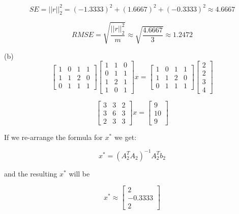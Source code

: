 \documentclass[unicode,11pt,a4paper,oneside,numbers=endperiod,openany]{scrartcl}
\newcommand{\norm}[1]{\lvert\lvert #1 \rvert\rvert}
\begin{document}
\begin{equation*}
 SE = \norm{r}_2^2 = (-1.3333)^2 + (1.6667)^2 + (-0.3333)^2 \approx 4.6667
\end{equation*}

\begin{equation*}
 RMSE = \sqrt{\frac{\norm{r}_2^2}{m}} \approx \sqrt{\frac{4.6667}{3}} \approx 1.2472 
\end{equation*}

(b)
\begin{equation*}
\begin{bmatrix}
1 & 0 & 1 & 1 \\
1 & 1 & 2 & 0 \\
0 & 1 & 1 & 1
\end{bmatrix}
\begin{bmatrix}
1 & 1 & 0 \\
0 & 1 & 1 \\
1 & 2 & 1 \\
1 & 0 & 1
\end{bmatrix}
x = \begin{bmatrix}
1 & 0 & 1 & 1 \\
1 & 1 & 2 & 0 \\
0 & 1 & 1 & 1
\end{bmatrix}
\begin{bmatrix}
2 \\
2 \\
3 \\
4
\end{bmatrix}
\end{equation*}

\begin{equation*}
 \begin{bmatrix}
  3 & 3 & 2 \\
  3 & 6 & 3 \\
  2 & 3 & 3
 \end{bmatrix}x = 
 \begin{bmatrix}
  9 \\
  10 \\
  9
 \end{bmatrix}
\end{equation*}

If we re-arrange the formula for ${x^*}$ we get:

\begin{equation}
 x^* = (A^T_2A_2)^{-1}A^T_2b_2
\end{equation}

and the resulting ${x^*}$ will be

\begin{equation*}
 x^* \approx \begin{bmatrix}
        2 \\
        -0.3333 \\
        2
       \end{bmatrix}
\end{equation*}
\end{document}
